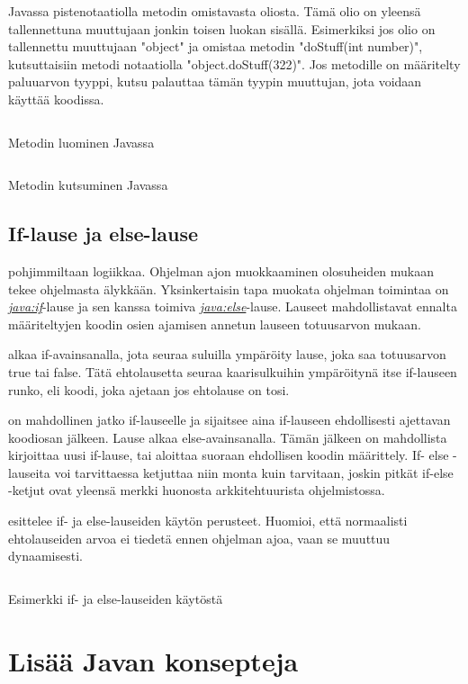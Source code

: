 \documentclass{tufte-book}
\newcommand{\java}[1]{\underline{\gls{java:#1}}}
\newcommand{\newjava}[1]{\textit{\java{#1}}}
\newcommand{\code}[3]{
\begin{listing}
    \inputminted{java}{OhjelmointiopasEsimerkit/src/#1/#2.java}
    \caption{#3}
    \label{Java-#1-#2}
\end{listing}
}
\begin{document}
 Javassa pistenotaatiolla metodin omistavasta oliosta. Tämä
olio on yleensä tallennettuna muuttujaan jonkin toisen luokan sisällä. Esimerkiksi jos olio
on tallennettu muuttujaan "object" ja omistaa metodin "doStuff(int number)", kutsuttaisiin
metodi notaatiolla "object.doStuff(322)". Jos metodille on määritelty paluuarvon tyyppi, kutsu
palauttaa tämän tyypin muuttujan, jota voidaan käyttää koodissa.

\code{week2/methodexample}{MethodClass}{Metodin luominen Javassa}
\code{week2/methodexample}{Main}{Metodin kutsuminen Javassa}

\subsection{If-lause ja else-lause}
\label{if else}

 pohjimmiltaan logiikkaa. Ohjelman ajon muokkaaminen olosuheiden
mukaan tekee ohjelmasta älykkään. Yksinkertaisin tapa muokata ohjelman toimintaa on
\newjava{if}-lause ja sen kanssa toimiva \newjava{else}-lause. Lauseet mahdollistavat ennalta
määriteltyjen koodin osien ajamisen annetun lauseen totuusarvon mukaan.

 alkaa if-avainsanalla, jota seuraa suluilla ympäröity lause, joka saa
totuusarvon true tai false. Tätä ehtolausetta seuraa kaarisulkuihin ympäröitynä itse if-lauseen
runko, eli koodi, joka ajetaan jos ehtolause on tosi.

 on mahdollinen jatko if-lauseelle ja sijaitsee aina if-lauseen
ehdollisesti ajettavan koodiosan jälkeen. Lause alkaa else-avainsanalla. Tämän jälkeen on
mahdollista kirjoittaa uusi if-lause, tai aloittaa suoraan ehdollisen koodin määrittely. If-
else -lauseita voi tarvittaessa ketjuttaa niin monta kuin tarvitaan, joskin pitkät if-else
-ketjut ovat yleensä merkki huonosta arkkitehtuurista ohjelmistossa.

 esittelee if- ja else-lauseiden käytön perusteet. Huomioi,
että normaalisti ehtolauseiden arvoa ei tiedetä ennen ohjelman ajoa, vaan se muuttuu dynaamisesti.

\code{week2/basicexamples}{IfElse}{Esimerkki if- ja else-lauseiden käytöstä}


\section{Lisää Javan konsepteja}
\label{ohjelman perusteista2}
\end{document}
